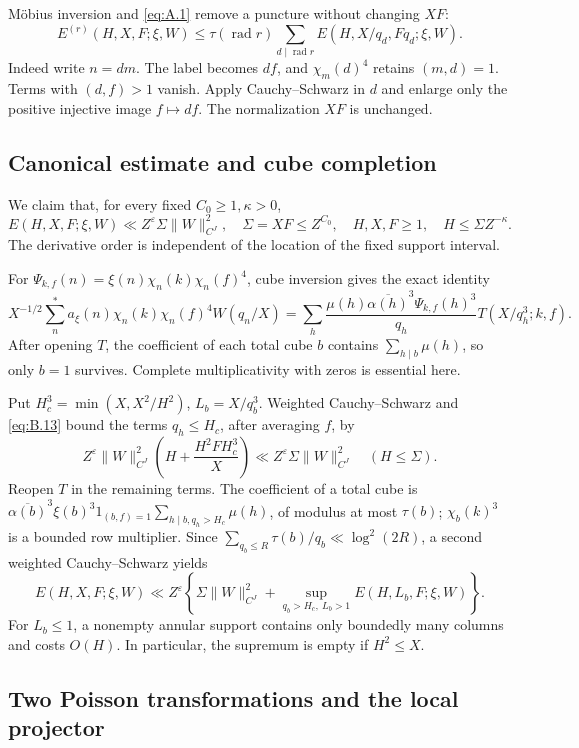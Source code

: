 \documentclass[11pt,a4paper]{article}
\begin{document}
Möbius inversion and \eqref{eq:A.1} remove a puncture without changing \(XF\): \[
E^{(r)}(H,X,F;\xi,W)
\le\tau(\operatorname{rad}r)
\sum_{d\mid\operatorname{rad}r}E(H,X/q_d,Fq_d;\xi,W).
\tag{C.4}\label{eq:C.4}
\] Indeed write \(n=dm\). The label becomes \(df\), and \(\chi_m(d)^4\) retains \((m,d)=1\). Terms with \((d,f)>1\) vanish. Apply Cauchy--Schwarz in \(d\) and enlarge only the positive injective image \(f\mapsto df\). The normalization \(XF\) is unchanged.

\subsection{Canonical estimate and cube completion}\label{sec:C.2}

We claim that, for every fixed \(C_0\ge1,\kappa>0\), \[
E(H,X,F;\xi,W)\ll Z^\varepsilon\Sigma\|W\|_{C^J}^2,
\quad \Sigma=XF\le Z^{C_0},\quad
H,X,F\ge1,\quad H\le\Sigma Z^{-\kappa}.
\tag{C.5}\label{eq:C.5}
\] The derivative order is independent of the location of the fixed support interval.

For \(\Psi_{k,f}(n)=\xi(n)\chi_n(k)\chi_n(f)^4\), cube inversion gives the exact identity \[
X^{-1/2}\sum_n^{*}a_\xi(n)\chi_n(k)\chi_n(f)^4W(q_n/X)
=\sum_h\frac{\mu(h)\overline{\alpha(h)}^{3}\Psi_{k,f}(h)^3}{q_h}
T(X/q_h^3;k,f).
\tag{C.6}\label{eq:C.6}
\] After opening \(T\), the coefficient of each total cube \(b\) contains \(\sum_{h\mid b}\mu(h)\), so only \(b=1\) survives. Complete multiplicativity with zeros is essential here.

Put \(H_c^3=\min(X,X^2/H^2)\), \(L_b=X/q_b^3\). Weighted Cauchy--Schwarz and \eqref{eq:B.13} bound the terms \(q_h\le H_c\), after averaging \(f\), by \[
Z^\varepsilon\|W\|_{C^J}^2\left(H+\frac{H^2F H_c^3}{X}\right)
\ll Z^\varepsilon\Sigma\|W\|_{C^J}^2\quad(H\le\Sigma).
\] Reopen \(T\) in the remaining terms. The coefficient of a total cube is \(\overline{\alpha(b)}^{3}\xi(b)^3 1_{(b,f)=1}\sum_{h\mid b,q_h>H_c}\mu(h)\), of modulus at most \(\tau(b)\); \(\chi_b(k)^3\) is a bounded row multiplier. Since \(\sum_{q_b\le R}\tau(b)/q_b\ll\log^2(2R)\), a second weighted Cauchy--Schwarz yields \[
E(H,X,F;\xi,W)
\ll Z^\varepsilon\left\{\Sigma\|W\|_{C^J}^2+
\sup_{q_b>H_c,\ L_b>1}E(H,L_b,F;\xi,W)\right\}.
\tag{C.7}\label{eq:C.7}
\] For \(L_b\le1\), a nonempty annular support contains only boundedly many columns and costs \(O(H)\). In particular, the supremum is empty if \(H^2\le X\).

\subsection{Two Poisson transformations and the local projector}\label{sec:C.3}
\end{document}
